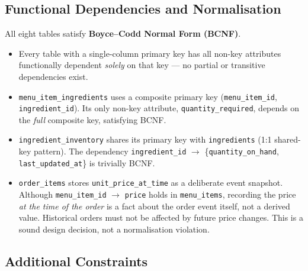 \documentclass[12pt,a4paper]{article}
\begin{document}
\subsection{Functional Dependencies and Normalisation}

All eight tables satisfy \textbf{Boyce--Codd Normal Form (BCNF)}.

\begin{itemize}
    \item Every table with a single-column primary key has all non-key attributes
          functionally dependent \emph{solely} on that key --- no partial or
          transitive dependencies exist.

    \item \texttt{menu\_item\_ingredients} uses a composite primary key
          (\texttt{menu\_item\_id}, \texttt{ingredient\_id}). Its only non-key
          attribute, \texttt{quantity\_required}, depends on the \emph{full}
          composite key, satisfying BCNF.

    \item \texttt{ingredient\_inventory} shares its primary key with
          \texttt{ingredients} (1:1 shared-key pattern). The dependency
          \texttt{ingredient\_id} $\to$ \{\texttt{quantity\_on\_hand},
          \texttt{last\_updated\_at}\} is trivially BCNF.

    \item \texttt{order\_items} stores \texttt{unit\_price\_at\_time} as a
          deliberate event snapshot. Although
          \texttt{menu\_item\_id} $\to$ \texttt{price} holds in
          \texttt{menu\_items}, recording the price \emph{at the time of the
          order} is a fact about the order event itself, not a derived value.
          Historical orders must not be affected by future price changes.
          This is a sound design decision, not a normalisation violation.
\end{itemize}

\subsection{Additional Constraints}
\end{document}
